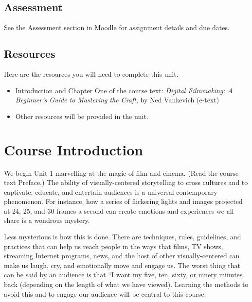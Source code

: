 \documentclass[
]{book}
\providecommand{\tightlist}{%
  \setlength{\itemsep}{0pt}\setlength{\parskip}{0pt}}
\begin{document}
\hypertarget{assessment}{%
\subsection*{Assessment}\label{assessment}}

See the Assessment section in Moodle for assignment details and due dates.

\hypertarget{resources}{%
\subsection*{Resources}\label{resources}}

Here are the resources you will need to complete this unit.

\begin{itemize}
\tightlist
\item
  Introduction and Chapter One of the course text: \emph{Digital Filmmaking: A Beginner's Guide to Mastering the Craft}, by Ned Vankevich (e-text)
\item
  Other resources will be provided in the unit.
\end{itemize}

\hypertarget{course-introduction}{%
\section{Course Introduction}\label{course-introduction}}

We begin Unit 1 marvelling at the magic of film and cinema. (Read the course text Preface.) The ability of visually-centered storytelling to cross cultures and to captivate, educate, and entertain audiences is a universal contemporary phenomenon. For instance, how a series of flickering lights and images projected at 24, 25, and 30 frames a second can create emotions and experiences we all share is a wondrous mystery.

Less mysterious is how this is done. There are techniques, rules, guidelines, and practices that can help us reach people in the ways that films, TV shows, streaming Internet programs, news, and the host of other visually-centered can make us laugh, cry, and emotionally move and engage us. The worst thing that can be said by an audience is that ``I want my five, ten, sixty, or ninety minutes back (depending on the length of what we have viewed). Learning the methods to avoid this and to engage our audience will be central to this course.
\end{document}
